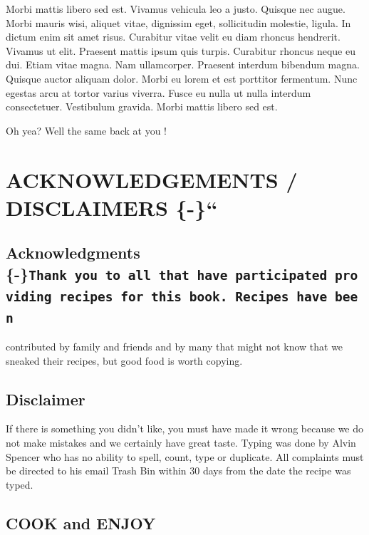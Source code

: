 \documentclass[
]{book}
\begin{document}
Morbi mattis libero sed est. Vivamus vehicula leo a justo. Quisque nec augue. Morbi mauris wisi, aliquet vitae, dignissim eget, sollicitudin molestie, ligula. In dictum enim sit amet risus. Curabitur vitae velit eu diam rhoncus hendrerit. Vivamus ut elit. Praesent mattis ipsum quis turpis. Curabitur rhoncus neque eu dui. Etiam vitae magna. Nam ullamcorper. Praesent interdum bibendum magna. Quisque auctor aliquam dolor. Morbi eu lorem et est porttitor fermentum. Nunc egestas arcu at tortor varius viverra. Fusce eu nulla ut nulla interdum consectetuer. Vestibulum gravida. Morbi mattis libero sed est.

Oh yea? Well the same back at you !

\hypertarget{acknowledgements-disclaimers--}{%
\chapter{ACKNOWLEDGEMENTS / DISCLAIMERS \{-\}``}\label{acknowledgements-disclaimers--}}

\hypertarget{acknowledgments--thank-you-to-all-that-have-participated-providing-recipes-for-this-book.-recipes-have-been}{%
\section{\texorpdfstring{Acknowledgments \{-\}\texttt{Thank\ you\ to\ all\ that\ have\ participated\ providing\ recipes\ for\ this\ book.\ Recipes\ have\ been}}{Acknowledgments \{-\}Thank you to all that have participated providing recipes for this book. Recipes have been}}\label{acknowledgments--thank-you-to-all-that-have-participated-providing-recipes-for-this-book.-recipes-have-been}}

contributed by family and friends and by many that might not know that we sneaked their recipes,
but good food is worth copying.

\hypertarget{disclaimer}{%
\section*{Disclaimer}\label{disclaimer}}


If there is something you didn't like, you must have made it wrong because we do not make mistakes and
we certainly have great taste. Typing was done by Alvin Spencer who has no ability to spell, count, type or duplicate.
All complaints must be directed to his email Trash Bin within 30 days from the date the recipe was typed.

\hypertarget{cook-and-enjoy}{%
\section*{COOK and ENJOY}\label{cook-and-enjoy}}
\end{document}
